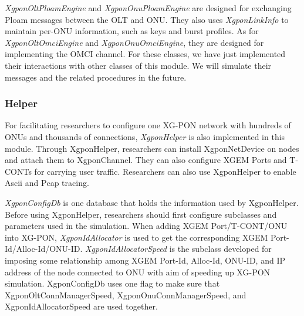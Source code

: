 \emph{XgponOltPloamEngine} and \emph{XgponOnuPloamEngine} are
designed for exchanging Ploam messages between the OLT and ONU.
They also uses \emph{XgponLinkInfo} to maintain per-ONU
information, such as keys and burst profiles. As for
\emph{XgponOltOmciEngine} and \emph{XgponOnuOmciEngine}, they are
designed for implementing the OMCI channel. For these classes, we
have just implemented their interactions with other classes of
this module. We will simulate their messages and  the related
procedures in the future.


\subsubsection{Helper}

For facilitating researchers to configure one XG-PON network with
hundreds of ONUs and thousands of connections, \emph{XgponHelper}
is also implemented in this module. Through XgponHelper,
researchers can install XgponNetDevice on nodes and attach them to
XgponChannel. They can also configure XGEM Ports and T-CONTs for
carrying user traffic. Researchers can also use XgponHelper to
enable Ascii and Pcap tracing.

\emph{XgponConfigDb} is one database that holds the information
used by XgponHelper. Before using XgponHelper, researchers should
first configure subclasses and parameters used in the simulation.
When adding XGEM Port/T-CONT/ONU into XG-PON,
\emph{XgponIdAllocator} is used to get the corresponding XGEM
Port-Id/Alloc-Id/ONU-ID. \emph{XgponIdAllocatorSpeed} is the
subclass developed for imposing some relationship among XGEM
Port-Id, Alloc-Id, ONU-ID, and IP address of the node connected to
ONU with aim of speeding up XG-PON simulation. XgponConfigDb uses
one flag to make sure that XgponOltConnManagerSpeed,
XgponOnuConnManagerSpeed, and XgponIdAllocatorSpeed are used
together.
